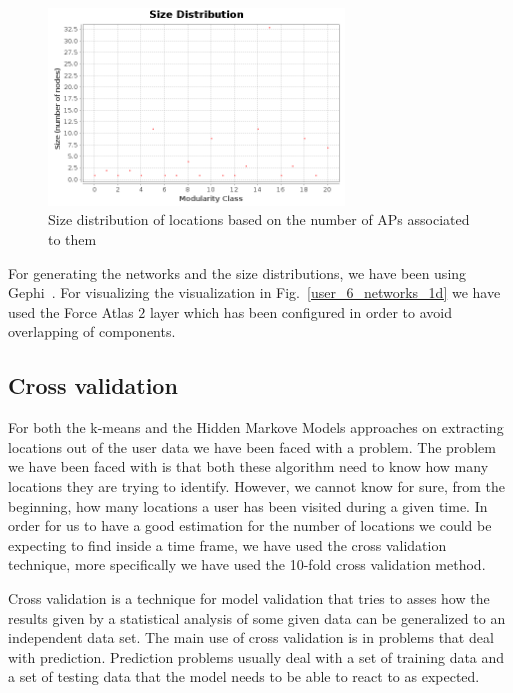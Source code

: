 \begin{figure}[!h]
\centering
\includegraphics[width=0.7\textwidth]{figures/networks/communities-size-distribution.png}
\caption{Size distribution of locations based on the number of APs associated to
them }
\label{user_6_size_distribution_1d}
\end{figure}

For generating the networks and the size distributions, we have been using
Gephi~\cite{Gephi}. For visualizing the visualization in
Fig.~\ref{user_6_networks_1d} we have used the Force Atlas $2$ layer which has
been configured in order to avoid overlapping of components.

\subsection{Cross validation}
\label{cross_valid}

For both the k-means and the Hidden Markove Models approaches on extracting
locations out of the user data we have been faced with a problem. The problem we
have been faced with is that both these algorithm need to know how many
locations they are trying to identify. However, we cannot know for sure, from
the beginning, how many locations a user has been visited during a given time.
In order for us to have a good estimation for the number of locations we could
be expecting to find inside a time frame, we have used the cross validation
technique, more specifically we have used the 10-fold cross validation method.

Cross validation \cite{Kohavi95astudy} is a technique for model validation that
tries to asses how the results given by a statistical analysis of some given
data can be generalized to an independent data set. The main use of cross
validation is in problems that deal with prediction. Prediction problems usually
deal with a set of training data and a set of testing data that the model needs
to be able to react to as expected.

